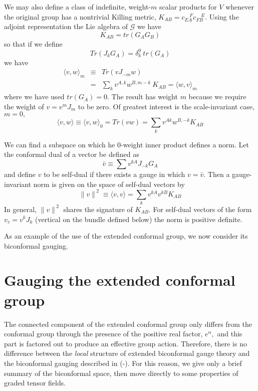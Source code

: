 \documentclass[a4paper,12pt]{article}
\begin{document}
\smallskip

We may also define a class of indefinite, weight-$m$ scalar products for $%
\mathit{V}$ whenever the original group has a nontrivial Killing metric, $%
K_{AB}=c_{EA}^{\quad F}c_{FB}^{\quad E}.$ Using the adjoint representation
the Lie algebra of $\mathcal{G}$ we have 
\begin{equation}
K_{AB}=tr(G_{A}G_{B})
\end{equation}
so that if we define 
\begin{equation}
Tr(J_{k}G_{A})=\delta _{k}^{0}\ tr(G_{A})
\end{equation}
we have 
\begin{eqnarray}
\langle v,w\rangle _{m} &\equiv &Tr(vJ_{-m}w) \\
&=&\sum_{k}v^{A,k}w^{B,m-k}\ K_{AB}=\langle w,v\rangle _{m}
\end{eqnarray}
where we have used $tr(G_{A})=0.$ The result has weight $m$ because we
require the weight of $v=v^{m}J_{m}$ to be zero. Of greatest interest is the
scale-invariant case, $m=0,$%
\begin{equation}
\langle v,w\rangle \equiv \langle v,w\rangle
_{0}=Tr(vw)=\sum_{k}v^{Ak}w^{B,-k}K_{AB}
\end{equation}

We can find a subspace on which he $0$-weight inner product defines a norm.
Let the conformal dual of a vector be defined as 
\begin{equation}
\bar{v}\equiv \sum v^{kA}J_{-k}G_{A}
\end{equation}
and define $v$ to be self-dual if there exists a gauge in which $v=\bar{v}.$
Then a gauge-invariant norm is given on the space of self-dual vectors by 
\begin{equation}
\parallel v\parallel ^{\ 2}\equiv \langle v,v\rangle
=\sum_{k}v^{kA}v^{kB}K_{AB}
\end{equation}
In general, $\parallel v\parallel ^{\ 2}$ shares the signature of $K_{AB}.$
For self-dual vectors of the form $v_{v}=v^{k}J_{k}$ (vertical on the bundle
defined below) the norm is positive definite.

As an example of the use of the extended conformal group, we now consider
its biconformal gauging.

\section{Gauging the extended conformal group}

The connected component of the extended conformal group only differs from
the conformal group through the presence of the positive real factor, $%
e^{\alpha },$ and this part is factored out to produce an effective group
action. Therefore, there is no difference between the \textit{local}
structure of extended biconformal gauge theory and the biconformal gauging
described in (\cite{New Conformal Gauging Paper}-\cite{WWIII}). For this reason, we give only a brief summary of the biconformal space, then move directly to some properties of graded tensor fields.
\end{document}
